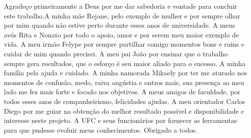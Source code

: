 \begin{agradecimentos}
	 Agradeço primeiramente a Deus por me dar sabedoria e vontade para concluir este trabalho.A minha mãe Rejane, pelo exemplo de mulher e por sempre olhar por mim quando não estive perto durante esses anos de universidade. A meus avós Rita e Nonato por todo o apoio, amor e por serem meu maior exemplo de vida. A meu irmão Felype por sempre partilhar comigo momentos bons e ruins e cuidar de mim quando precisei. A meu pai João por ensinar que o trabalho sempre gera resultados, que o esforço é seu maior aliado para o sucesso. A minha família pela ajuda e cuidado. A minha namorada Mikaely por ter me aturado nos momentos de confusão, medo, raiva angústia e outros mais, sua presença ao meu lado me fez mais forte e focado nos objetivos. A meus amigos de faculdade, por todos esses anos de companheirismo, felicidades ajudas. A meu orientador Carlos Diego por me guiar na obtenção do melhor resultado possível e disponibilidade e interesse neste projeto. A UFC e seus funcionários por fornecer as ferramentas para que pudesse evoluir meus conhecimentos. Obrigado a todos.
\end{agradecimentos}
